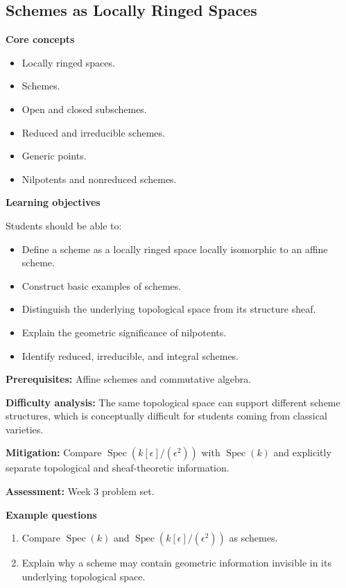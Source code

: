 \documentclass[11pt]{article}
\begin{document}
\subsection{Schemes as Locally Ringed Spaces}

\textbf{Core concepts}
\begin{itemize}
    \item Locally ringed spaces.
    \item Schemes.
    \item Open and closed subschemes.
    \item Reduced and irreducible schemes.
    \item Generic points.
    \item Nilpotents and nonreduced schemes.
\end{itemize}

\textbf{Learning objectives}

Students should be able to:
\begin{itemize}
    \item Define a scheme as a locally ringed space locally isomorphic to an affine scheme.
    \item Construct basic examples of schemes.
    \item Distinguish the underlying topological space from its structure sheaf.
    \item Explain the geometric significance of nilpotents.
    \item Identify reduced, irreducible, and integral schemes.
\end{itemize}

\textbf{Prerequisites:} Affine schemes and commutative algebra.

\textbf{Difficulty analysis:} The same topological space can support different scheme structures, which is conceptually difficult for students coming from classical varieties.

\textbf{Mitigation:} Compare $\operatorname{Spec}(k[\epsilon]/(\epsilon^2))$ with $\operatorname{Spec}(k)$ and explicitly separate topological and sheaf-theoretic information.

\textbf{Assessment:} Week 3 problem set.

\textbf{Example questions}
\begin{enumerate}
    \item Compare $\operatorname{Spec}(k)$ and $\operatorname{Spec}(k[\epsilon]/(\epsilon^2))$ as schemes.
    \item Explain why a scheme may contain geometric information invisible in its underlying topological space.
\end{enumerate}
\end{document}
